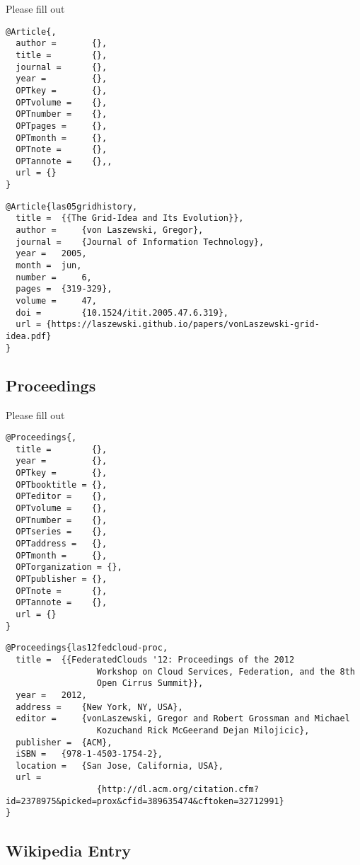 Please fill out

\begin{verbatim}
@Article{,
  author =       {},
  title =        {},
  journal =      {},
  year =         {},
  OPTkey =       {},
  OPTvolume =    {},
  OPTnumber =    {},
  OPTpages =     {},
  OPTmonth =     {},
  OPTnote =      {},
  OPTannote =    {},,
  url = {}
}
\end{verbatim}

\begin{verbatim}
@Article{las05gridhistory,
  title =  {{The Grid-Idea and Its Evolution}},
  author =     {von Laszewski, Gregor},
  journal =    {Journal of Information Technology},
  year =   2005,
  month =  jun,
  number =     6,
  pages =  {319-329},
  volume =     47,
  doi =        {10.1524/itit.2005.47.6.319},
  url = {https://laszewski.github.io/papers/vonLaszewski-grid-idea.pdf}
}
\end{verbatim}

\subsection{Proceedings}\label{proceedings}

Please fill out

\begin{verbatim}
@Proceedings{,
  title =        {},
  year =         {},
  OPTkey =       {},
  OPTbooktitle = {},
  OPTeditor =    {},
  OPTvolume =    {},
  OPTnumber =    {},
  OPTseries =    {},
  OPTaddress =   {},
  OPTmonth =     {},
  OPTorganization = {},
  OPTpublisher = {},
  OPTnote =      {},
  OPTannote =    {},
  url = {}
}
\end{verbatim}

\begin{verbatim}
@Proceedings{las12fedcloud-proc,
  title =  {{FederatedClouds '12: Proceedings of the 2012
                  Workshop on Cloud Services, Federation, and the 8th
                  Open Cirrus Summit}},
  year =   2012,
  address =    {New York, NY, USA},
  editor =     {vonLaszewski, Gregor and Robert Grossman and Michael
                  Kozuchand Rick McGeerand Dejan Milojicic},
  publisher =  {ACM},
  iSBN =   {978-1-4503-1754-2},
  location =   {San Jose, California, USA},
  url =
                  {http://dl.acm.org/citation.cfm?id=2378975&picked=prox&cfid=389635474&cftoken=32712991}
}
\end{verbatim}

\subsection{Wikipedia Entry}\label{wikipedia-entry}

